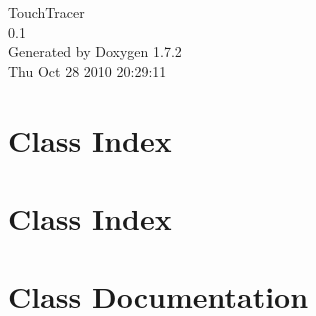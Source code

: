 \documentclass[a4paper]{book}
\begin{document}
\hypersetup{pageanchor=false}
\begin{titlepage}
\vspace*{7cm}
\begin{center}
{\Large TouchTracer \\[1ex]\large 0.1 }\\
\vspace*{1cm}
{\large Generated by Doxygen 1.7.2}\\
\vspace*{0.5cm}
{\small Thu Oct 28 2010 20:29:11}\\
\end{center}
\end{titlepage}
\clearemptydoublepage
{}
\tableofcontents
\clearemptydoublepage
{}
\hypersetup{pageanchor=true}
\chapter{Class Index}

\chapter{Class Index}

\chapter{Class Documentation}









\printindex
\end{document}
